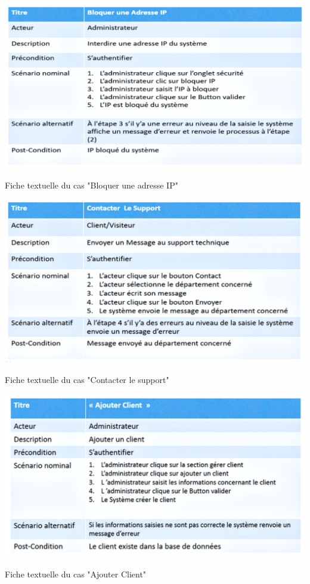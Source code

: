 \documentclass[a4paper, 12pt]{report}
\begin{document}
\begin{table}[H]
	\centering
	\includegraphics{img/fiche/4}
	\caption{Fiche textuelle du cas "Bloquer une adresse IP"}
	\label{Tux}
\end{table}
\begin{table}[H]
	\centering
	\includegraphics{img/fiche/5}
	\caption{Fiche textuelle du cas "Contacter le support"}
	\label{Tux}
\end{table}
\begin{table}[H]
	\centering
	\includegraphics{img/fiche/6}
	\caption{Fiche textuelle du cas "Ajouter Client"}
	\label{Tux}
\end{table}
\end{document}
